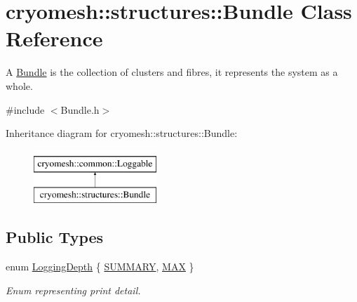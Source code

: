 \hypertarget{classcryomesh_1_1structures_1_1Bundle}{\section{cryomesh\-:\-:structures\-:\-:\-Bundle \-Class \-Reference}
\label{classcryomesh_1_1structures_1_1Bundle}
}


\-A \hyperlink{classcryomesh_1_1structures_1_1Bundle}{\-Bundle} is the collection of clusters and fibres, it represents the system as a whole.  




{\ttfamily \#include $<$\-Bundle.\-h$>$}

\-Inheritance diagram for cryomesh\-:\-:structures\-:\-:\-Bundle\-:\begin{figure}[H]
\begin{center}
\leavevmode
\includegraphics[height=2.000000cm]{classcryomesh_1_1structures_1_1Bundle}
\end{center}
\end{figure}
\subsection*{\-Public \-Types}
\begin{DoxyCompactItemize}
\item 
enum \hyperlink{classcryomesh_1_1common_1_1Loggable_a4d85401f6c81bc8ed94e49d66ae574c5}{\-Logging\-Depth} \{ \hyperlink{classcryomesh_1_1common_1_1Loggable_a4d85401f6c81bc8ed94e49d66ae574c5a51f5abcf5a53a8930a09b065fc64a44f}{\-S\-U\-M\-M\-A\-R\-Y}, 
\hyperlink{classcryomesh_1_1common_1_1Loggable_a4d85401f6c81bc8ed94e49d66ae574c5ae496af0b41e3b64530b61e315822cc51}{\-M\-A\-X}
 \}
\begin{DoxyCompactList}\small\item\em \-Enum representing print detail. \end{DoxyCompactList}\end{DoxyCompactItemize}
